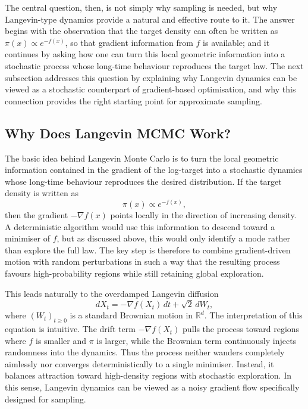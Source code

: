 \documentclass[a4paper,11pt, titlepage]{article}
\theoremstyle{definition}
\theoremstyle{plain}
\theoremstyle{remark}
\begin{document}
The central question, then, is not simply why sampling is needed, but why Langevin-type dynamics provide a natural and effective route to it. The answer begins with the observation that the target density can often be written as $\pi(x)\propto e^{-f(x)}$, so that gradient information from $f$ is available; and it continues by asking how one can turn this local geometric information into a stochastic process whose long-time behaviour reproduces the target law. The next subsection addresses this question by explaining why Langevin dynamics can be viewed as a stochastic counterpart of gradient-based optimisation, and why this connection provides the right starting point for approximate sampling.


\subsection{Why Does Langevin MCMC Work?}

The basic idea behind Langevin Monte Carlo is to turn the local geometric information contained in the gradient of the log-target into a stochastic dynamics whose long-time behaviour reproduces the desired distribution. If the target density is written as
\[
\pi(x) \propto e^{-f(x)},
\]
then the gradient $-\nabla f(x)$ points locally in the direction of increasing density. A deterministic algorithm would use this information to descend toward a minimiser of $f$, but as discussed above, this would only identify a mode rather than explore the full law. The key step is therefore to combine gradient-driven motion with random perturbations in such a way that the resulting process favours high-probability regions while still retaining global exploration.

This leads naturally to the overdamped Langevin diffusion
\[
dX_t = -\nabla f(X_t)\,dt + \sqrt{2}\,dW_t,
\]
where $(W_t)_{t\geq 0}$ is a standard Brownian motion in $\mathbb{R}^d$. The interpretation of this equation is intuitive. The drift term $-\nabla f(X_t)$ pulls the process toward regions where $f$ is smaller and $\pi$ is larger, while the Brownian term continuously injects randomness into the dynamics. Thus the process neither wanders completely aimlessly nor converges deterministically to a single minimiser. Instead, it balances attraction toward high-density regions with stochastic exploration. In this sense, Langevin dynamics can be viewed as a noisy gradient flow specifically designed for sampling.
\end{document}
